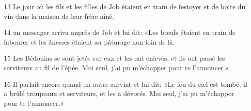 13 Le jour où les fils et les filles de Job étaient en train de festoyer et de boire du vin dans la maison de leur frère aîné,

14 un messager arriva auprès de Job et lui dit: «Les bœufs étaient en train de labourer et les ânesses étaient au pâturage non loin de là.

15 Les Bédouins se sont jetés sur eux et les ont enlevés, et ils ont passé les serviteurs au fil de l’épée. Moi seul, j’ai pu m’échapper pour te l’annoncer.»

16 Il parlait encore quand un autre survint et lui dit: «Le feu du ciel est tombé, il a brûlé troupeaux et serviteurs, et les a dévorés. Moi seul, j’ai pu m’échapper pour te l’annoncer.»
